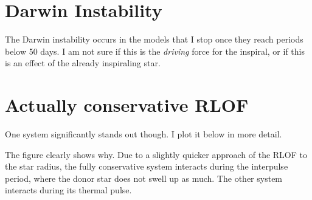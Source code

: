 \documentclass[a4paper,10pt]{article}
\begin{document}
\nextpage
\section{Darwin Instability}

The Darwin instability occurs in the models that I stop once they reach periods below 50 days. I am not sure if this is the \emph{driving} force for the inspiral, or if this is an effect of the already inspiraling star. 
\begin{figure}[ht]
    \centering
\end{figure}

\section{Actually conservative RLOF}

\begin{figure}[ht]
    \centering
\end{figure}

\begin{figure}[ht]
    \centering
\end{figure}

One system significantly stands out though. I plot it below in more detail.

\begin{figure}[ht]
    \centering
\end{figure}

The figure clearly shows why. Due to a slightly quicker approach of the RLOF to the star radius, the fully conservative system interacts during the interpulse period, where the donor star does not swell up as much. The other system interacts during its thermal pulse.

\begin{figure}[ht]
    \centering
\end{figure}

\begin{figure}[ht]
    \centering
\end{figure}
\end{document}
